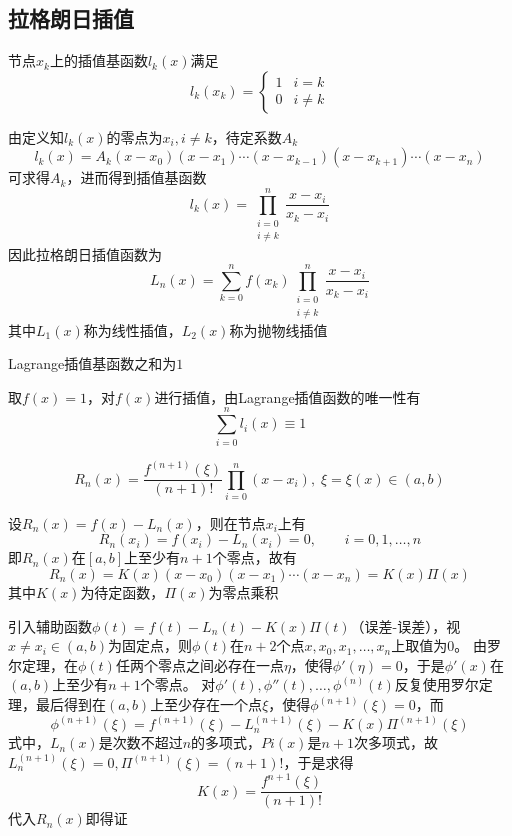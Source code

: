 \subsection{拉格朗日插值}
\begin{definition}[拉格朗日插值基函数]
节点$x_k$上的插值基函数$l_k(x)$满足
\[l_k(x_k)=\begin{cases}1&i=k\\0&i\ne k\end{cases}\]
\end{definition}
\par 由定义知$l_k(x)$的零点为$x_i,i\ne k$，待定系数$A_k$
\[l_k(x)=A_k(x-x_0)(x-x_1)\cdots(x-x_{k-1})(x-x_{k+1})\cdots(x-x_n)\]
可求得$A_k$，进而得到插值基函数
\[l_k(x)=\prod_{\substack{i=0\\i\ne k}}^{n}\frac{x-x_i}{x_k-x_i}\]
因此拉格朗日插值函数为
\[L_n(x)=\sum_{k=0}^nf(x_k)\prod_{\substack{i=0\\i\ne k}}^{n}\frac{x-x_i}{x_k-x_i}\]
其中$L_1(x)$称为线性插值，$L_2(x)$称为抛物线插值

\begin{theorem}
    Lagrange插值基函数之和为$1$
\end{theorem}
\begin{analysis}
    取$f(x)=1$，对$f(x)$进行插值，由Lagrange插值函数的唯一性有
    \[\sum_{i=0}^nl_i(x)\equiv 1\]
\end{analysis}

\begin{theorem}[Lagrange函数的误差估计]
\[R_n(x)=\frac{f^{(n+1)}(\xi)}{(n+1)!}\prod_{i=0}^n(x-x_i),\;\xi=\xi(x)\in(a,b)\]
\end{theorem}
\begin{analysis}
    设$R_n(x)=f(x)-L_n(x)$，则在节点$x_i$上有
    \[R_n(x_i)=f(x_i)-L_n(x_i)=0,\qquad i=0,1,\ldots,n\]
    即$R_n(x)$在$[a,b]$上至少有$n+1$个零点，故有
    \[R_n(x)=K(x)(x-x_0)(x-x_1)\cdots(x-x_n)=K(x)\Pi(x)\]
    其中$K(x)$为待定函数，$\Pi(x)$为零点乘积

    引入辅助函数$\phi(t)=f(t)-L_n(t)-K(x)\Pi(t)$（误差-误差），视$x\ne x_i\in(a,b)$为固定点，则$\phi(t)$在$n+2$个点$x,x_0,x_1,\ldots,x_n$上取值为$0$。
    由罗尔定理，在$\phi(t)$任两个零点之间必存在一点$\eta$，使得$\phi'(\eta)=0$，于是$\phi'(x)$在$(a,b)$上至少有$n+1$个零点。
    对$\phi'(t),\phi''(t),\ldots,\phi^{(n)}(t)$反复使用罗尔定理，最后得到在$(a,b)$上至少存在一个点$\xi$，使得$\phi^{(n+1)}(\xi)=0$，而
    \[\phi^{(n+1)}(\xi)=f^{(n+1)}(\xi)-L_n^{(n+1)}(\xi)-K(x)\Pi^{(n+1)}(\xi)\]
    式中，$L_n(x)$是次数不超过$n$的多项式，$Pi(x)$是$n+1$次多项式，故$L_n^{(n+1)}(\xi)=0,\Pi^{(n+1)}(\xi)=(n+1)!$，于是求得
    \[K(x)=\frac{f^{n+1}(\xi)}{(n+1)!}\]
    代入$R_n(x)$即得证
\end{analysis}

